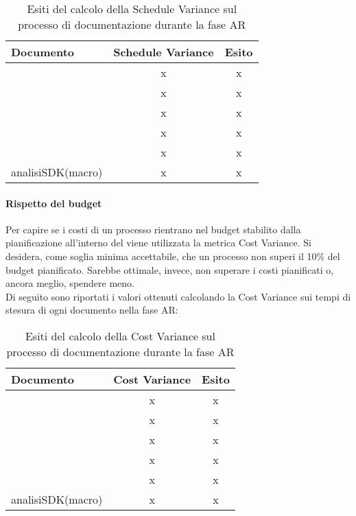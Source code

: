 \documentclass[PianoDiQualifica.tex]{subfiles}
\begin{document}
			\begin{table}[h]
				\centering
				\begin{tabular}{l c c}
					\hline
					\rule[-0.3cm]{0cm}{0.8cm}
					\textbf{Documento} & \textbf{Schedule Variance} & \textbf{Esito} \\
					\hline
					\rule[0cm]{0cm}{0.4cm}
					\PPdocRR & x & x \\
					\rule[0cm]{0cm}{0.4cm}
					\NPdocRR & x & x \\ 
					\rule[0cm]{0cm}{0.4cm}
					\ARdocRR & x & x \\ 
					\rule[0cm]{0cm}{0.4cm}
					\PQdocRR & x & x \\ 
					\rule[0cm]{0cm}{0.4cm}
					\Gldoc & x & x \\ 
					\rule[0cm]{0cm}{0.4cm}
					analisiSDK(macro) & x & x \\ 
					\hline
				\end{tabular}
				\caption{Esiti del calcolo della Schedule Variance sul processo di documentazione durante la fase AR}
			\end{table}
		\paragraph{Rispetto del budget}
		Per capire se i costi di un processo rientrano nel budget stabilito dalla pianificazione all'interno del 				\PPdocRR{} viene utilizzata la metrica Cost Variance. Si desidera, come soglia minima accettabile, che un 				processo non superi il 10\% del budget pianificato. Sarebbe ottimale, invece, non superare i costi pianificati 			o, ancora meglio, spendere meno.\\
		Di seguito sono riportati i valori ottenuti calcolando la Cost Variance sui tempi di stesura di ogni 				documento nella fase AR:\\
\begin{table}[h]
				\centering
				\begin{tabular}{l c c}
					\hline
					\rule[-0.3cm]{0cm}{0.8cm}
					\textbf{Documento} & \textbf{Cost Variance} & \textbf{Esito} \\
					\hline
					\rule[0cm]{0cm}{0.4cm}
					\PPdocRR & x & x \\
					\rule[0cm]{0cm}{0.4cm}
					\NPdocRR & x & x \\ 
					\rule[0cm]{0cm}{0.4cm}
					\ARdocRR & x & x \\ 
					\rule[0cm]{0cm}{0.4cm}
					\PQdocRR & x & x \\ 
					\rule[0cm]{0cm}{0.4cm}
					\Gldoc & x & x \\ 
					\rule[0cm]{0cm}{0.4cm}
					analisiSDK(macro) & x & x \\ 
					\hline
				\end{tabular}
				\caption{Esiti del calcolo della Cost Variance sul processo di documentazione durante la fase AR}
			\end{table}		
		
\end{document}
